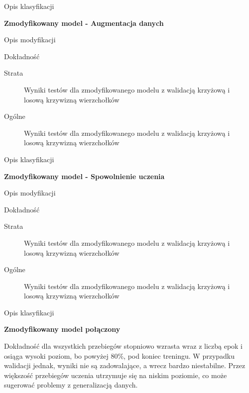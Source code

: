 Opis klasyfikacji %

\textbf{Zmodyfikowany model - Augmentacja danych}

Opis modyfikacji %

Dokładność %

Strata %

\begin{figure}[ht]
	\centering
	\caption{Wyniki testów dla zmodyfikowanego modelu z walidacją krzyżową i losową krzywizną wierzchołków}
	\label{Fig:tests-cv-1}
\end{figure}
\FloatBarrier
Ogólne %

\begin{figure}[ht]
	\centering
	\caption{Wyniki testów dla zmodyfikowanego modelu z walidacją krzyżową i losową krzywizną wierzchołków}
	\label{Fig:tests-cv-1}
\end{figure}
\FloatBarrier

Opis klasyfikacji %

\textbf{Zmodyfikowany model - Spowolnienie uczenia}

Opis modyfikacji %

Dokładność %

Strata %

\begin{figure}[ht]
	\centering
	\caption{Wyniki testów dla zmodyfikowanego modelu z walidacją krzyżową i losową krzywizną wierzchołków}
	\label{Fig:tests-cv-1}
\end{figure}
\FloatBarrier

Ogólne %

\begin{figure}[ht]
	\centering
	\caption{Wyniki testów dla zmodyfikowanego modelu z walidacją krzyżową i losową krzywizną wierzchołków}
	\label{Fig:tests-cv-1}
\end{figure}
\FloatBarrier

Opis klasyfikacji %

\textbf{Zmodyfikowany model połączony}

Dokładność dla wszystkich przebiegów stopniowo wzrasta wraz z liczbą epok
i osiąga wysoki poziom, bo powyżej 80\%, pod koniec treningu.
W przypadku walidacji jednak, wyniki nie są zadowalające, a wrecz bardzo niestabilne.
Przez większość przebiegów uczenia utrzymuje się na niskim poziomie,
co może sugerować problemy z generalizacją danych.

